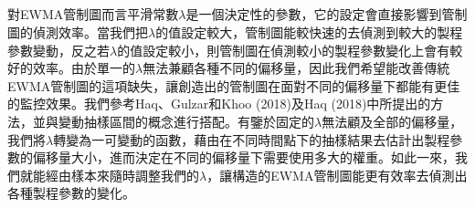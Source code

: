 \documentclass[12pt]{article}  %
\theoremstyle{plain}
\begin{document}
\subsection{}
對EWMA管制圖而言平滑常數$\lambda$是一個決定性的參數，它的設定會直接影響到管制圖的偵測效率。當我們把$\lambda$的值設定較大，管制圖能較快速的去偵測到較大的製程參數變動，反之若$\lambda$的值設定較小，則管制圖在偵測較小的製程參數變化上會有較好的效率。由於單一的$\lambda$無法兼顧各種不同的偏移量，因此我們希望能改善傳統EWMA管制圖的這項缺失，讓創造出的管制圖在面對不同的偏移量下都能有更佳的監控效果。我們參考Haq、Gulzar和Khoo (2018)及Haq (2018)中所提出的方法，並與變動抽樣區間的概念進行搭配。有鑒於固定的$\lambda$無法顧及全部的偏移量，我們將$\lambda$轉變為一可變動的函數，藉由在不同時間點下的抽樣結果去估計出製程參數的偏移量大小，進而決定在不同的偏移量下需要使用多大的權重。如此一來，我們就能經由樣本來隨時調整我們的$\lambda$，讓構造的EWMA管制圖能更有效率去偵測出各種製程參數的變化。
\end{document}

